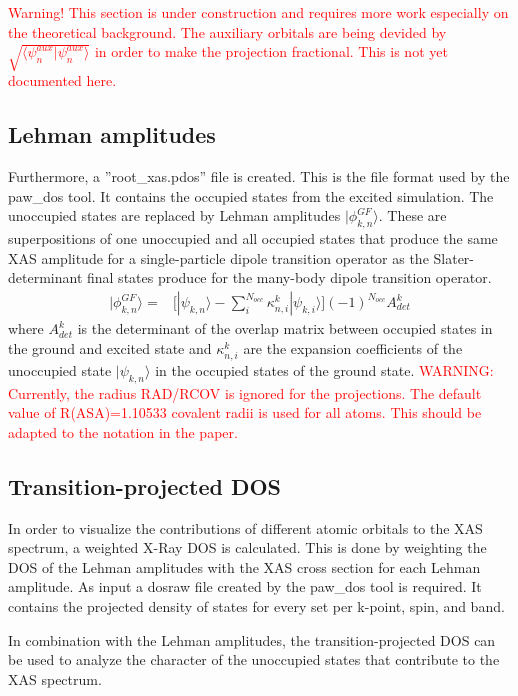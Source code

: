 \documentclass[final,12pt,makeidx,DIV=calc]{article}
\begin{document}
{{{{{{\textcolor{red}{Warning! This section is under construction and requires more work especially
on the theoretical background. The auxiliary orbitals are being devided by 
$\sqrt{\langle \psi^{aux}_n|\psi^{aux}_n\rangle}$ in order to make the projection
fractional. This is not yet documented here.}

\subsection{Lehman amplitudes}
Furthermore, a ''root\_xas.pdos'' file is created. This is the file format used
by the paw\_dos tool. It contains the occupied states from the excited 
simulation. The unoccupied states are replaced by Lehman amplitudes
$|\phi_{k,n}^{GF}\rangle$.
These are superpositions of one unoccupied and all occupied states that produce
the same XAS amplitude for a single-particle dipole transition operator as the 
Slater-determinant final states produce for the many-body dipole transition 
operator.
\begin{eqnarray}
  |\phi_{k,n}^{GF}\rangle =& \bigl[ |\psi_{k,n}\rangle - \sum_i^{N_{occ}}\kappa_{n,i}^k
  |\psi_{k,i}\rangle \bigr] (-1)^{N_{occ}}A_{det}^k
\end{eqnarray}
where $A_{det}^k$ is the determinant of the overlap matrix between occupied
states in the ground and excited state and $\kappa_{n,i}^k$ are the expansion
coefficients of the unoccupied state $|\psi_{k,n}\rangle$ in the occupied
states of the ground state.
\textcolor{red}{WARNING: Currently, the radius RAD/RCOV is ignored for the
projections. The default value of R(ASA)=1.10533 covalent radii is used for 
all atoms.}
\textcolor{red}{This should be adapted to the notation in the paper.}

\subsection{Transition-projected DOS}
In order to visualize the contributions of different atomic orbitals to the
XAS spectrum, a weighted X-Ray DOS is calculated. This is done by weighting
the DOS of the Lehman amplitudes with the XAS cross section for each Lehman amplitude.
As input a dosraw file created by the paw\_dos tool is required. It contains
the projected density of states for every set per k-point, spin, and band.

In combination with the Lehman amplitudes, the transition-projected DOS
can be used to analyze the character of the unoccupied states that
contribute to the XAS spectrum.

}}}}}}
\end{document}
